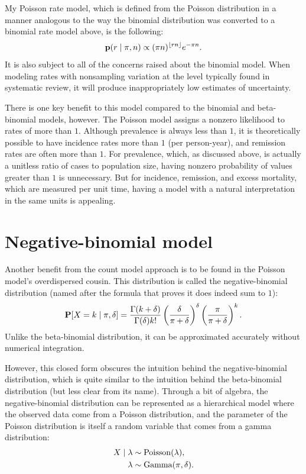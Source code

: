 My Poisson rate model, which is defined from the Poisson distribution
in a manner analogous to the way the binomial distribution was
converted to a binomial rate model above, is the following:
\[
\mathbf{p}(r\;|\; \pi,n) \propto
(\pi n)^{\lfloor
  rn\rfloor} e^{-\pi n}.
\]
It is also subject to all of the concerns raised about the binomial
model.  When modeling rates with nonsampling variation at the level
typically found in systematic review, it will produce
inappropriately low estimates of uncertainty.

There is one key benefit to this model compared to the binomial and
beta-binomial models, however.  The Poisson model assigns a nonzero
likelihood to rates of more than $1$.  Although prevalence is always
less than $1$, it is theoretically possible to have incidence rates
more than $1$ (per person-year), and remission rates are often more
than $1$.  For prevalence, which, as discussed above, is actually a
unitless ratio of cases to population size, having nonzero probability
of values greater than $1$ is unnecessary.  But for incidence,
remission, and excess mortality, which are measured per unit time,
having a model with a natural interpretation in the same units is
appealing.


\section{Negative-binomial model}
Another benefit from the count model approach is to be found in the
Poisson model's overdispersed cousin.  This distribution is called
the negative-binomial distribution (named after the formula that
proves it does indeed sum to $1$):
\[
\mathbf{P}[X = k\;|\; \pi, \delta] =
 \frac{\Gamma(k+\delta)}{\Gamma(\delta)k!} \left(\frac{\delta}{\pi+\delta}\right)^\delta \left(\frac{\pi}{\pi+\delta}\right)^k.
\]
Unlike the beta-binomial distribution, it can be approximated
accurately without numerical integration.

However, this closed form obscures the intuition behind the
negative-binomial distribution, which is quite similar to the
intuition behind the beta-binomial distribution (but less clear from
its name). Through a bit of algebra, the negative-binomial
distribution can be represented as a hierarchical model where the
observed data come from a Poisson distribution, and the parameter of
the Poisson distribution is itself a random variable that comes from a
gamma distribution:
\begin{align*}
X\;|\; \lambda &\sim \operatorname{Poisson}(\lambda),\\
\lambda &\sim \operatorname{Gamma}(\pi, \delta).
\end{align*}

